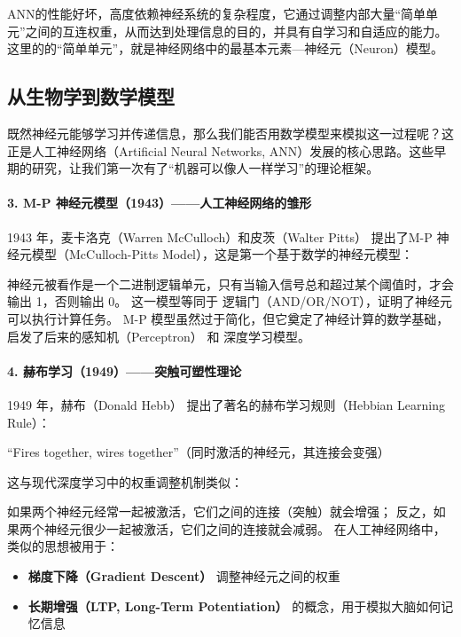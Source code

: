 ANN的性能好坏，高度依赖神经系统的复杂程度，它通过调整内部大量“简单单元”之间的互连权重，从而达到处理信息的目的，并具有自学习和自适应的能力。这里的的“简单单元”，就是神经网络中的最基本元素—神经元（Neuron）模型。


\subsection{从生物学到数学模型}

既然神经元能够学习并传递信息，那么我们能否用数学模型来模拟这一过程呢？这正是人工神经网络（Artificial Neural Networks, ANN）发展的核心思路。这些早期的研究，让我们第一次有了“机器可以像人一样学习”的理论框架。


\paragraph{3. M-P 神经元模型（1943）——人工神经网络的雏形}
1943 年，麦卡洛克（Warren McCulloch）和皮茨（Walter Pitts） 提出了M-P 神经元模型（McCulloch-Pitts Model），这是第一个基于数学的神经元模型：

神经元被看作是一个二进制逻辑单元，只有当输入信号总和超过某个阈值时，才会输出 1，否则输出 0。
这一模型等同于 逻辑门（AND/OR/NOT），证明了神经元可以执行计算任务。
M-P 模型虽然过于简化，但它奠定了神经计算的数学基础，启发了后来的感知机（Perceptron） 和 深度学习模型。



\paragraph{4. 赫布学习（1949）——突触可塑性理论}
1949 年，赫布（Donald Hebb） 提出了著名的赫布学习规则（Hebbian Learning Rule）：

“Fires together, wires together”（同时激活的神经元，其连接会变强）

这与现代深度学习中的权重调整机制类似：

如果两个神经元经常一起被激活，它们之间的连接（突触）就会增强；
反之，如果两个神经元很少一起被激活，它们之间的连接就会减弱。
在人工神经网络中，类似的思想被用于：
\begin{itemize}
\item {\bf 梯度下降（Gradient Descent）} 调整神经元之间的权重
\item {\bf 长期增强（LTP, Long-Term Potentiation）} 的概念，用于模拟大脑如何记忆信息
\end{itemize}

